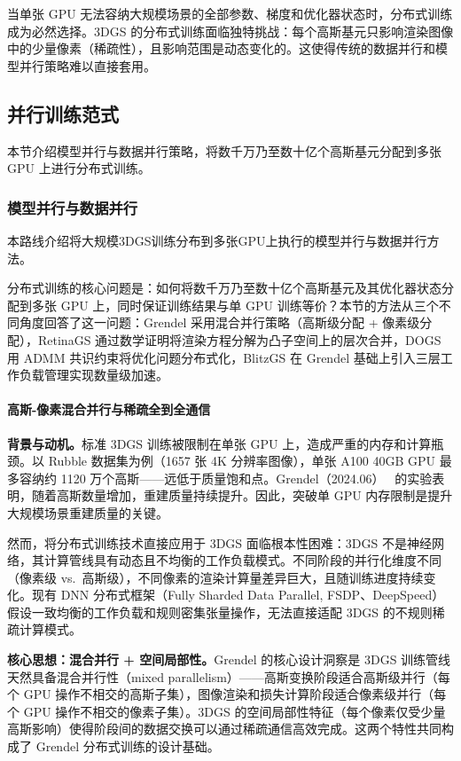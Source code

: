 当单张 GPU 无法容纳大规模场景的全部参数、梯度和优化器状态时，分布式训练成为必然选择。3DGS 的分布式训练面临独特挑战：每个高斯基元只影响渲染图像中的少量像素（稀疏性），且影响范围是动态变化的。这使得传统的数据并行和模型并行策略难以直接套用。

\subsection{并行训练范式}
\label{ss:14_7}

本节介绍模型并行与数据并行策略，将数千万乃至数十亿个高斯基元分配到多张 GPU 上进行分布式训练。

\subsubsection{模型并行与数据并行}

本路线介绍将大规模3DGS训练分布到多张GPU上执行的模型并行与数据并行方法。

分布式训练的核心问题是：如何将数千万乃至数十亿个高斯基元及其优化器状态分配到多张 GPU 上，同时保证训练结果与单 GPU 训练等价？本节的方法从三个不同角度回答了这一问题：Grendel 采用混合并行策略（高斯级分配 + 像素级分配），RetinaGS 通过数学证明将渲染方程分解为凸子空间上的层次合并，DOGS 用 ADMM 共识约束将优化问题分布式化，BlitzGS 在 Grendel 基础上引入三层工作负载管理实现数量级加速。

\paragraph{高斯-像素混合并行与稀疏全到全通信}

\textbf{背景与动机。}标准 3DGS 训练被限制在单张 GPU 上，造成严重的内存和计算瓶颈。以 Rubble 数据集为例（1657 张 4K 分辨率图像），单张 A100 40GB GPU 最多容纳约 1120 万个高斯——远低于质量饱和点。Grendel（2024.06）~\cite{2406_18533} 的实验表明，随着高斯数量增加，重建质量持续提升。因此，突破单 GPU 内存限制是提升大规模场景重建质量的关键。

然而，将分布式训练技术直接应用于 3DGS 面临根本性困难：3DGS 不是神经网络，其计算管线具有动态且不均衡的工作负载模式。不同阶段的并行化维度不同（像素级 vs.\ 高斯级），不同像素的渲染计算量差异巨大，且随训练进度持续变化。现有 DNN 分布式框架（Fully Sharded Data Parallel, FSDP、DeepSpeed）假设一致均衡的工作负载和规则密集张量操作，无法直接适配 3DGS 的不规则稀疏计算模式。

\textbf{核心思想：混合并行 + 空间局部性。}Grendel 的核心设计洞察是 3DGS 训练管线天然具备混合并行性（mixed parallelism）——高斯变换阶段适合高斯级并行（每个 GPU 操作不相交的高斯子集），图像渲染和损失计算阶段适合像素级并行（每个 GPU 操作不相交的像素子集）。3DGS 的空间局部性特征（每个像素仅受少量高斯影响）使得阶段间的数据交换可以通过稀疏通信高效完成。这两个特性共同构成了 Grendel 分布式训练的设计基础。

